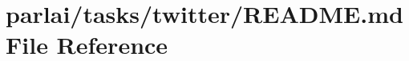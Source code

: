 \hypertarget{parlai_2tasks_2twitter_2README_8md}{}\section{parlai/tasks/twitter/\+R\+E\+A\+D\+ME.md File Reference}
\label{parlai_2tasks_2twitter_2README_8md}
